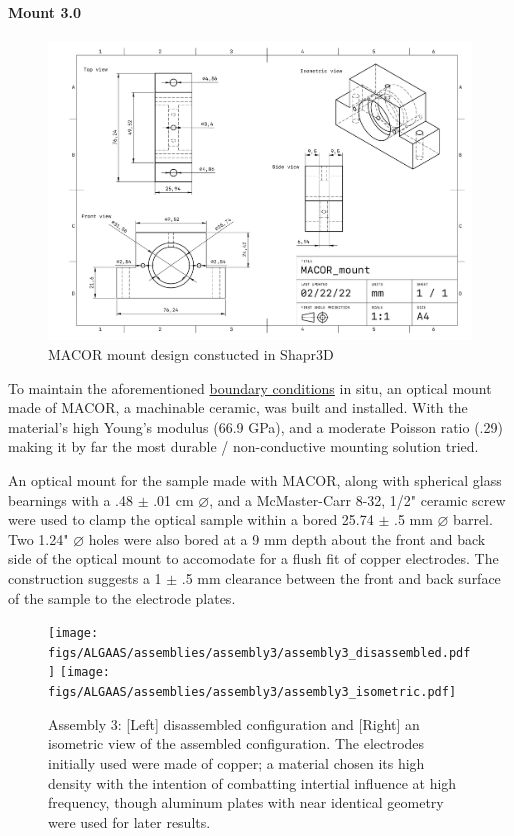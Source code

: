 \paragraph*{Mount 3.0}

\begin{figure}[H]
\includegraphics[width=\textwidth]{figs/ALGAAS/assemblies/assembly3/MACOR_mount.pdf}
\caption{MACOR mount design constucted in Shapr3D}
\label{fig:macormountdesign}
\end{figure}

To maintain the aforementioned \hyperlink{fig:laplacecoords}{boundary conditions} in situ, an optical mount made of MACOR, a machinable ceramic, was built and installed. With the material's high Young's modulus (66.9 GPa), and a moderate Poisson ratio (.29) \cite{macor} making it by far the most durable / non-conductive mounting solution tried.

An optical mount for the sample made with MACOR, along with spherical glass bearnings with a .48 $\pm$ .01 cm $\diameter$, and a McMaster-Carr 8-32, 1/2" ceramic screw were used to clamp the optical sample within a bored 25.74 $\pm$ .5 mm $\diameter$ barrel. Two 1.24" $\diameter$ holes were also bored at a 9 mm depth about the front and back side of the optical mount to accomodate for a flush fit of copper electrodes. The construction suggests a 1 $\pm$ .5 mm clearance between the front and back surface of the sample to the electrode plates.

\begin{figure}[!ht]
    \centering
    \begin{subcaptiongroup}
	    \texttt{[image: figs/ALGAAS/assemblies/assembly3/assembly3\_disassembled.pdf]}
	    \label{subfig:A3disassembled}
	    \texttt{[image: figs/ALGAAS/assemblies/assembly3/assembly3\_isometric.pdf]}
	    \label{subfig:A3isometric}
    \end{subcaptiongroup}
    \caption{Assembly 3: [Left] disassembled configuration and [Right] an isometric view of the assembled configuration. The electrodes initially used were made of copper; a material chosen its high density with the intention of combatting intertial influence at high frequency, though aluminum plates with near identical geometry were used for later results.}
    \label{fig:assembly3}
\end{figure}

